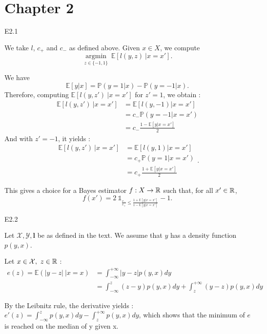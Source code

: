 \section{Chapter 2}
\begin{questions}
\question E2.1 

\begin{solution}
    We take $l$, $c_+$ and $c_-$ as defined above. Given $x \in X$, we compute $$\underset{z \in \{-1,1\}}{\operatorname{argmin}} ~ \mathbb{E}[l(y,z) ~ | x=x'] .$$

    We have $$\mathbb{E}[y|x] = \mathbb{P}(y=1|x) - \mathbb{P}(y=-1|x).$$
    Therefore, computing $\mathbb{E}[l(y, z') ~ | x=x']$ for $z'=1$, we obtain :
    $$\begin{aligned}
        \mathbb{E}[l(y, z') ~ | x=x'] &= \mathbb{E} [l(y, -1) | x=x'] \\ 
        &= c_-\mathbb{P}(y=-1 | x=x') \\
        &= c_- \frac{1-\mathbb{E}[y|x=x']}{2}
    \end{aligned}$$
    And with $z'=-1$, it yields :
    $$\begin{aligned}
    \mathbb{E}[l(y, z') ~ | x=x'] &= \mathbb{E} [l(y, 1) | x=x'] \\
    &= c_+\mathbb{P}(y=1 | x=x') \\
    &= c_+ \frac{1+\mathbb{E}[y|x=x']}{2}
    \end{aligned}.$$

    This gives a choice for a Bayes estimator $f : X \rightarrow \mathbb{R}$ such that, for all $x' \in \mathbb{R}$, $$f(x') = 2 ~\mathds{1}_{\frac{c_-}{c_+} \leq \frac{1+\mathbb{E}[y|x=x']}{1-\mathbb{E}[y|x=x']}} - 1.$$
\end{solution}

\question E2.2

\begin{solution}
Let $\mathcal{X, Y}, \boldsymbol{l}$ be as defined in the text. We assume that $y$ has a density function $p(y, x)$.

    Let $x\in \mathcal{X}, ~z\in \mathbb{R}$ :
    $$
    \begin{aligned}
        e(z) = \mathbb{E} (|y-z| ~|x=x) &= \int_{-\infty}^{+\infty} |y-z| p(y, x) dy \\
        &= \int_{-\infty}^{z} (z-y) p(y, x) dy + \int_{z}^{+\infty} (y-z) p(y, x) dy
    \end{aligned}
    $$

    By the Leibnitz rule, the derivative yields : $e'(z) = \int_{-\infty}^{z} p(y, x) dy - \int_{z}^{+\infty} p(y, x) dy$, which shows that the minimum of $e$ is reached on the median of y given x.


\end{solution}
\end{questions}
